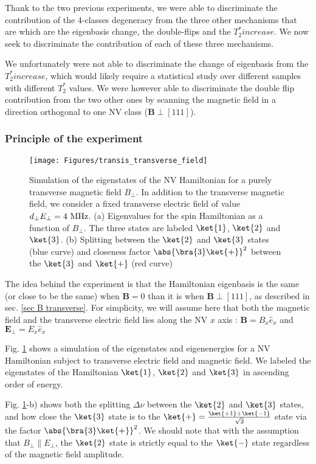 \documentclass[a4paper,11pt]{report}
\begin{document}
Thank to the two previous experiments, we were able to discriminate the contribution of the 4-classes degeneracy from the three other mechanisms that are which are the eigenbasis change, the double-flips and the $T_2^* increase$. We now seek to discriminate the contribution of each of these three mechanisms.

We unfortunately were not able to discriminate the change of eigenbasis from the $T_2^* increase$, which would likely require a statistical study over different samples with different $T_2^*$ values. We were however able to discriminate the double flip contribution from the two other ones by scanning the magnetic field in a direction orthogonal to one NV class ($\mathbf{B} \perp [111]$).

\subsubsection{Principle of the experiment}
\begin{figure}[h]
\centering
\texttt{[image: Figures/transis\_transverse\_field]}
\caption{Simulation of the eigenstates of the NV Hamiltonian for  a purely transverse magnetic field $B_\perp$. In addition to the transverse magnetic field, we consider a fixed transverse electric field of value $d_\perp E_\perp=4\ \rm MHz$. (a) Eigenvalues for the spin Hamiltonian as a function of $B_\perp$. The three states are labeled $\ket{1}$, $\ket{2}$ and $\ket{3}$. (b) Splitting between the $\ket{2}$ and $\ket{3}$ states (blue curve) and closeness factor $\abs{\bra{3}\ket{+}}^2$ between the $\ket{3}$ and $\ket{+}$ (red curve)}
\label{eigenstates transverse field}
\end{figure}

The idea behind the experiment is that the Hamiltonian eigenbasis is the same (or close to be the same) when $\mathbf{B}=0$ than it is when $\mathbf{B} \perp [111]$, as described in sec. \ref{sec B transverse}. For simplicity, we will assume here that both the magnetic field and the transverse electric field lies along the NV $x$ axis : $\mathbf{B}=B_x \hat{e}_x$ and $\mathbf{E}_\perp =E_x \hat{e}_x$

Fig. \ref{eigenstates transverse field} shows a simulation of the eigenstates and eigenenergies for a NV Hamiltonian subject to transverse electric field and magnetic field. We labeled the eigenstates of the Hamiltonian $\ket{1}$, $\ket{2}$ and $\ket{3}$ in ascending order of energy.

Fig. \ref{eigenstates transverse field}-b) shows both the splitting $\Delta \nu$ between the $\ket{2}$ and $\ket{3}$ states, and how close the $\ket{3}$ state is to the $\ket{+}=\frac{\ket{+1}+\ket{-1}}{\sqrt{2}}$ state via the factor $\abs{\bra{3}\ket{+}}^2$. We should note that with the assumption that $B_\perp \parallel E_\perp$, the $\ket{2}$ state is strictly equal to the $\ket{-}$ state regardless of the magnetic field amplitude.
\end{document}
